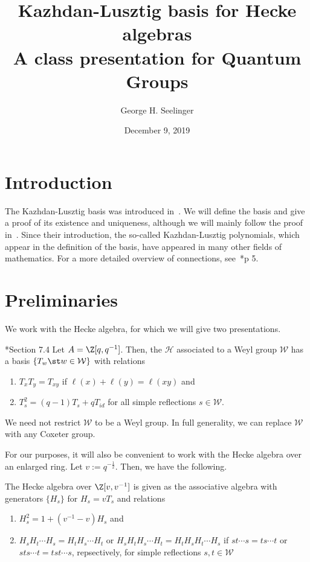 \documentclass[11pt,leqno,oneside]{amsart}
\title[Kazhdan-Lusztig Basis]{Kazhdan-Lusztig basis for Hecke algebras
  \\ A class presentation for Quantum Groups}
\author{George H. Seelinger}
\date{December 9, 2019}
\numberwithin{thm}{section}
\renewcommand{\W}{\mathcal{W}}
\renewcommand{\H}{\mathcal{H}} %
\begin{document}
\maketitle
\section{Introduction}
The Kazhdan-Lusztig basis was introduced in~\cite{kl}. We will define
the basis and give 
a proof of its existence and uniqueness, although we will mainly
follow the proof in~\cite{soergel}. Since their introduction, the
so-called Kazhdan-Lusztig polynomials, which appear in the definition
of the basis, have appeared in many other fields of mathematics. For a
more detailed overview of connections, see~\cite{brenti}*{p 5}.
\section{Preliminaries}
We work with the Hecke algebra, for which we will give two
presentations.
\begin{defn}
  \cite{humphreys}*{Section 7.4} Let \(A = \Z[q,q^{-1}]\). Then, the
   \(\H\) associated to 
  a Weyl group \(\W\) has a basis \(\{T_w \st w \in \W\}\) with
  relations
  \begin{enumerate}
  \item \(T_x T_y = T_{xy}\) if \(\ell(x) + \ell(y) = \ell(xy)\) and
  \item \(T_s^2 = (q-1)T_s + qT_{id}\) for all simple reflections \(s
    \in \W\).
  \end{enumerate}
\end{defn}
\begin{rmk}
  We need not restrict \(\W\) to be a Weyl group. In full generality,
  we can replace \(\W\) with any Coxeter group.
\end{rmk}
For our purposes, it will also be convenient to work with the Hecke
algebra over an enlarged ring. Let \(v := q^{-\frac{1}{2}}\). Then, we
have the following.
\begin{prop}
  The Hecke algebra over \(\Z[v,v^{-1}]\) is given as the associative algebra
  with generators \(\{H_s\}\) for \(H_s = vT_s\) and relations
  \begin{enumerate}
  \item \(H_s^2 = 1 + (v^{-1}-v)H_s\) and 
  \item \(H_s H_t \cdots H_s = H_t H_s \cdots H_t\) or \(H_s H_t H_s
    \cdots H_t = H_t H_s H_t \cdots H_s\) if \(st\cdots s = ts \cdots
    t\) or \(sts \cdots t = tst \cdots s\), repsectively, for simple
    reflections \(s,t \in \W\)
  \end{enumerate}
\end{prop}
\end{document}

